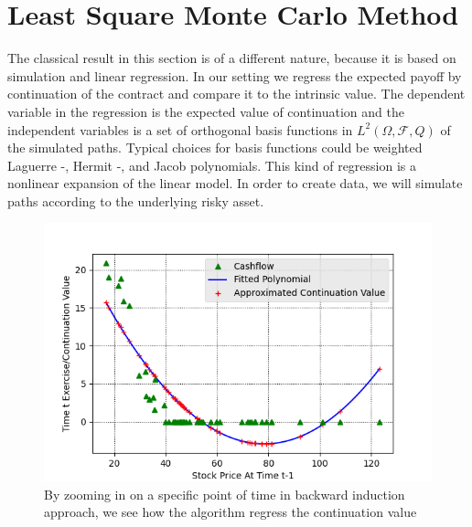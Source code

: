 
\section{Least Square Monte Carlo Method}\label{LSM}
The classical result in this section is of a different nature, because it is based on simulation and linear regression. In our setting we regress the expected payoff by continuation of the contract and compare it to the intrinsic value. The dependent variable in the regression is the expected value of continuation and the independent variables is a set of orthogonal basis functions in $L^2(\Omega, \mathcal{F}, Q)$ of the simulated paths. Typical choices for basis functions could be weighted Laguerre -, Hermit -, and Jacob polynomials. This kind of regression is a nonlinear expansion of the linear model. In order to create data, we will simulate paths according to the underlying risky asset. 

\begin{figure}[H]
\centering
\includegraphics{Figures/LSMFit1.png}
\decoRule
\caption[Polynomial Regression Of Continuation Value]{By zooming in on a specific point of time in backward induction approach, we see how the algorithm regress the continuation value}
\label{fig:binConv}
\end{figure}

